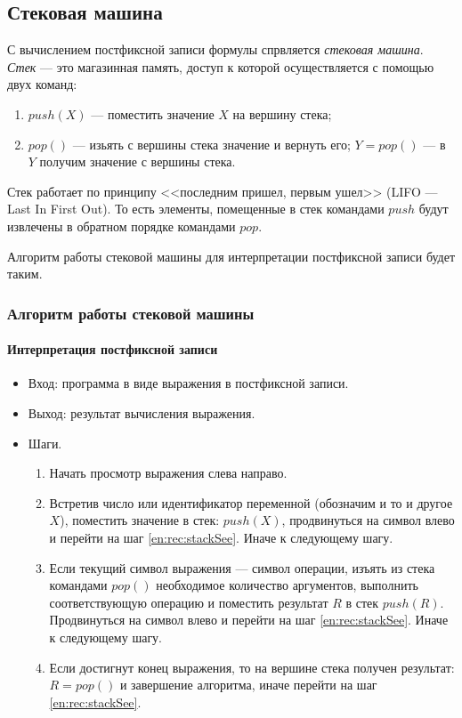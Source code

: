 \subsection{Стековая машина}

С вычислением постфиксной записи формулы спрвляется \emph{стековая машина}. \emph{Стек} --- это магазинная память, доступ к которой осуществляется с помощью двух команд:
\begin{enumerate}
    \item $push(X)$ --- поместить значение $X$ на вершину стека;
    \item $pop()$ --- изьять с вершины стека значение и вернуть его; $Y=pop()$ --- в $Y$ получим значение с вершины стека.
\end{enumerate}

Стек работает по принципу <<последним пришел, первым ушел>> (LIFO --- Last In First Out). То есть элементы, помещенные в стек командами $push$ будут извлечены в обратном порядке командами $pop$.

Алгоритм работы стековой машины для интерпретации постфиксной записи будет таким.
\begin{frame}
    \frametitle{Алгоритм работы стековой машины}
    \framesubtitle{Интерпретация постфиксной записи}
    \begin{itemize}
        \item Вход: программа в виде выражения в постфиксной записи.
        \item Выход: результат вычисления выражения.
        \item Шаги.
        \begin{enumerate}
            \item Начать просмотр выражения слева направо.
            \item \label{en:rec:stackSee}Встретив число или идентификатор переменной (обозначим и то и другое $X$), поместить значение в стек: $push(X)$, продвинуться на символ влево и перейти на шаг \ref{en:rec:stackSee}. Иначе к следующему шагу.
            \item Если текущий символ выражения --- символ операции, изъять из стека командами $pop()$ необходимое количество аргументов, выполнить соответствующую операцию и поместить результат $R$ в стек $push(R)$. Продвинуться на символ влево и перейти на шаг \ref{en:rec:stackSee}. Иначе к следующему шагу.
            \item Если достигнут конец выражения, то на вершине стека получен результат: $R=pop()$ и завершение алгоритма, иначе перейти на шаг \ref{en:rec:stackSee}.
        \end{enumerate}
    \end{itemize}
\end{frame}


